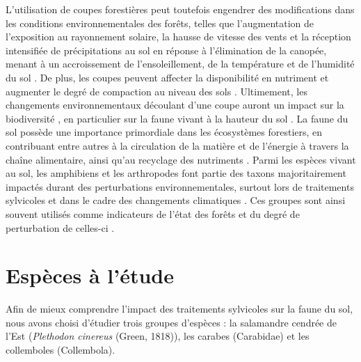 L'utilisation de coupes forestières peut toutefois engendrer des modifications dans les conditions environnementales des forêts, 
telles que l'augmentation de l'exposition au rayonnement solaire, la hausse de vitesse des vents et la réception intensifiée de précipitations au sol en réponse à l'élimination de la canopée, 
menant à un accroissement de l'ensoleillement, de la température et de l'humidité du sol \citep{Keenan1993ecologicaleffects,Lindo2003Microbialbiomass,Heithecker2007Edgerelatedgradients}.
De plus, les coupes peuvent affecter la disponibilité en nutriment et augmenter le degré de compaction au niveau des sols \citep{Battigelli2004Shorttermimpact,Covington1981Changesforest,Lindo2003Microbialbiomass,rousseauLongtermEffectsBiomass2018}. 
Ultimement, les changements environnementaux découlant d'une coupe auront un impact sur la biodiversité \citep{Chaudhary2016Impactforest,Fedrowitz2014Canretention,Paillet2010Biodiversitydifferences}, 
en particulier sur la faune vivant à la hauteur du sol \citep{Chaudhary2016Impactforest,Lindo2003Microbialbiomass,Kudrin2023metaanalysiseffects}.
La faune du sol possède une importance primordiale dans les écosystèmes forestiers, en contribuant entre autres à la circulation de la matière et de l'énergie à travers la chaîne alimentaire, ainsi qu'au recyclage des nutriments \citep{Kudrin2023metaanalysiseffects,Seibold2021contributioninsects}.
Parmi les espèces vivant au sol, les amphibiens et les arthropodes font partie des taxons majoritairement impactés durant des perturbations environnementales, 
surtout lors de traitements sylvicoles \citep{Hartshorn2021reviewforest,Semlitsch2009Effectstimber,Stuart2004Statustrends} et dans le cadre des changements climatiques \citep{Alford1999Globalamphibian,Houlahan2000Quantitativeevidence,Milanovich2010Projectedloss,Parmesan2006EcologicalEvolutionary,Pounds2006Widespreadamphibian,Warren2018projectedeffect}. 
Ces groupes sont ainsi souvent utilisés comme indicateurs de l'état des forêts et du degré de perturbation de celles-ci \citep{birdChangesSoilLitter2004,Maleque2009Arthropodsbioindicators,pongeVerticalDistributionCollembola2000}.


\section*{Espèces à l'étude}
\label{sec:species}

Afin de mieux comprendre l'impact des traitements sylvicoles sur la faune du sol, nous avons choisi d'étudier trois groupes d'espèces : la salamandre cendrée de l'Est (\textit{Plethodon cinereus} (Green, 1818)), 
les carabes (Carabidae) et les collemboles (Collembola).

